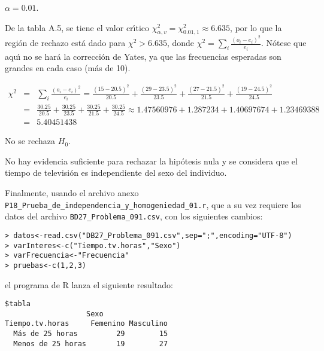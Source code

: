 \begin{solucion}
 \begin{significancia}
  $\alpha = 0.01$.
 \end{significancia}

 \begin{region}
  De la tabla A.5, se tiene el valor cr\'{\i}tico
  $\chi^2_{\alpha,v} = \chi^2_{0.01,1} \approx 6.635$,
  por lo que la regi\'on de rechazo est\'a dado
  para $\chi^2 > 6.635$, donde
  $\chi^2 = \sum_{i} \frac{\left( o_i - e_i \right)^2}{e_i}$.
  N\'otese que aqu\'{\i} no se har\'a la correcci\'on de Yates,
  ya que las frecuencias esperadas son grandes en cada caso (m\'as de 10).
 \end{region}

 \begin{estadistico}
  \begin{eqnarray*}
   \chi^2 & = & \sum_{i} \frac{\left( o_i - e_i \right)^2}{e_i}
   = \frac{(15 - 20.5)^2}{20.5} + \frac{(29 - 23.5)^2}{23.5} +
   \frac{(27 - 21.5)^2}{21.5} + \frac{(19 - 24.5)^2}{24.5} \\
   & = & \frac{30.25}{20.5} + \frac{30.25}{23.5} + \frac{30.25}{21.5} + 
   \frac{30.25}{24.5}
   \approx 1.47560976 + 1.287234 + 1.40697674 + 1.23469388 \\
   & = & 5.40451438
  \end{eqnarray*}
 \end{estadistico}

 \begin{decision}
  No se rechaza $H_0$.
 \end{decision}

 \begin{conclusion}
  No hay evidencia suficiente para rechazar la hip\'otesis nula 
  y se considera que el tiempo de televisi\'on es independiente
  del sexo del individuo.
 \end{conclusion}
 
 Finalmente, usando el archivo anexo
 \texttt{P18\_Prueba\_de\_independencia\_y\_homogeniedad\_01.r},
 que a su vez requiere los datos del archivo
 \texttt{BD27\_Problema\_091.csv}, con los siguientes cambios:
 \begin{verbatim}
> datos<-read.csv("DB27_Problema_091.csv",sep=";",encoding="UTF-8")
> varInteres<-c("Tiempo.tv.horas","Sexo")
> varFrecuencia<-"Frecuencia"
> pruebas<-c(1,2,3)
 \end{verbatim}
 \vspace{-0.5cm}
 el programa de R lanza el siguiente resultado:
 \begin{verbatim}
$tabla
                   Sexo
Tiempo.tv.horas     Femenino Masculino
  Más de 25 horas         29        15
  Menos de 25 horas       19        27


\end{verbatim}
\end{solucion}
